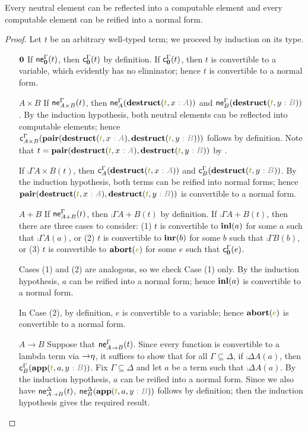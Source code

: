 \documentclass[a4paper]{article}
\begin{document}
\begin{theorem}
  Every neutral element can be reflected into a computable element and every computable element can be reified into a normal form.
\end{theorem}
\begin{proof}
  Let $t$ be an arbitrary well-typed term; we proceed by induction on its type.
  \begin{itemize}
  \item[$\mathbf{0}$] If $\operatorname{\mathsf{ne}}^{\Gamma}_{\mathbf{0}}(t)$, then $\operatorname{\mathsf{c}}^{\Gamma}_{\mathbf{0}}(t)$ by definition.
    If $\operatorname{\mathsf{c}}^{\Gamma}_{\mathbf{0}}(t)$, then $t$ is convertible to a variable, which evidently has no eliminator; hence $t$ is convertible to a normal form.
  \item[$A \times B$] If $\operatorname{\mathsf{ne}}^{\Gamma}_{A \times B}(t)$, then $\neu{\Gamma}{A}(\tmDestruct{t}{x\tpAnno{A}})$ and $\neu{\Gamma}{B}(\tmDestruct{t}{y\tpAnno{B}})$.
    By the induction hypothesis, both neutral elements can be reflected into computable elements; hence $\comp{\Gamma}{A \times B}(\tmPair{\tmDestruct{t}{x\tpAnno{A}}}{\tmDestruct{t}{y\tpAnno{B}}})$ follows by definition.
    Note that $t = \tmPair{\tmDestruct{t}{x\tpAnno{A}}}{\tmDestruct{t}{y\tpAnno{B}}}$ by \rProde.

    If $\comp{\Gamma}{A \times B}(t)$, then $\comp{\Gamma}{A}(\tmDestruct{t}{x\tpAnno{A}})$ and $\comp{\Gamma}{B}(\tmDestruct{t}{y\tpAnno{B}})$.
    By the induction hypothesis, both terms can be reified into normal forms; hence $\tmPair{\tmDestruct{t}{x\tpAnno{A}}}{\tmDestruct{t}{y\tpAnno{B}}}$ is convertible to a normal form.
  \item[$A + B$] If $\operatorname{\mathsf{ne}}^{\Gamma}_{A + B}(t)$, then $\comp{\Gamma}{A + B}(t)$ by definition.
    If $\comp{\Gamma}{A + B}(t)$, then there are three cases to consider: (1) $t$ is convertible to $\operatorname{\mathbf{inl}}(a)$ for some $a$ such that $\comp{\Gamma}{A}(a)$, or (2) $t$ is convertible to $\operatorname{\mathbf{inr}}(b)$ for some $b$ such that $\comp{\Gamma}{B}(b)$, or (3) $t$ is convertible to $\tmAbort{e}$ for some $e$ such that $\operatorname{\mathsf{c}}^{\Gamma}_{\mathbf{0}}(e)$.

    Cases (1) and (2) are analogous, so we check Case (1) only.
    By the induction hypothesis, $a$ can be reified into a normal form; hence $\operatorname{\mathbf{inl}}(a)$ is convertible to a normal form.

    In Case (2), by definition, $e$ is convertible to a variable; hence $\tmAbort{e}$ is convertible to a normal form.
  \item[$A \to B$] Suppose that $\operatorname{\mathsf{ne}}^{\Gamma}_{A \to B}(t)$.
    Since every function is convertible to a lambda term via $\textsc{$\mathord{\to}\eta$}$, it suffices to show that for all $\Gamma \subseteq \Delta$, if $\comp{\Delta}{A}(a)$, then $\comp{\Gamma}{B}(\tmApp{t}{a}{y\tpAnno{B}})$.
    Fix $\Gamma \subseteq \Delta$ and let $a$ be a term such that $\comp{\Delta}{A}(a)$.
    By the induction hypothesis, $a$ can be reified into a normal form.
    Since we also have $\operatorname{\mathsf{ne}}^{\Delta}_{A \to B}(t)$, $\neu{\Delta}{B}(\tmApp{t}{a}{y\tpAnno{B}})$ follows by definition; then the induction hypothesis gives the required result.


\end{itemize}
\end{proof}
\end{document}
